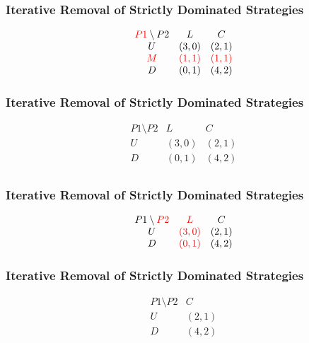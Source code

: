\begin{frame}
    \frametitle{Iterative Removal of Strictly Dominated Strategies}
    \begin{equation*}
        \begin{matrix}
            \textcolor{red}{P1} \setminus P2 & L & C \\
            U & (3,0) & (2,1) \\
            \textcolor{red}{M} & \textcolor{red}{(1,1)} & \textcolor{red}{(1,1)} \\
            D & (0,1) & (4,2) \\
        \end{matrix}
    \end{equation*}
\end{frame}


\begin{frame}
    \frametitle{Iterative Removal of Strictly Dominated Strategies}
    \begin{equation*}
        \begin{matrix}
            P1\setminus P2 & L & C \\
            U & (3,0) & (2,1) \\
            D & (0,1) & (4,2) \\
        \end{matrix}
    \end{equation*}
\end{frame}


\begin{frame}
    \frametitle{Iterative Removal of Strictly Dominated Strategies}
    \begin{equation*}
        \begin{matrix}
            P1\setminus \textcolor{red}{P2} & \textcolor{red}{L} & C \\
            U & \textcolor{red}{(3,0)} & (2,1) \\
            D & \textcolor{red}{(0,1)} & (4,2) \\
        \end{matrix}
    \end{equation*}
\end{frame}


\begin{frame}
    \frametitle{Iterative Removal of Strictly Dominated Strategies}
    \begin{equation*}
        \begin{matrix}
            P1\setminus P2 & C \\
            U & (2,1) \\
            D & (4,2) \\
        \end{matrix}
    \end{equation*}
\end{frame}


